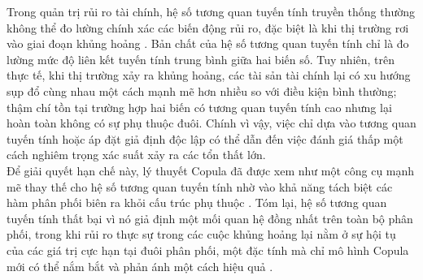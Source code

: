Trong quản trị rủi ro tài chính, hệ số tương quan tuyến tính truyền thống thường không thể đo lường chính xác các biến động rủi ro, đặc biệt là khi thị trường rơi vào giai đoạn khủng hoảng \cite{shreve2009faulty}. Bản chất của hệ số tương quan tuyến tính chỉ là đo lường mức độ liên kết tuyến tính trung bình giữa hai biến số. Tuy nhiên, trên thực tế, khi thị trường xảy ra khủng hoảng, các tài sản tài chính lại có xu hướng sụp đổ cùng nhau một cách mạnh mẽ hơn nhiều so với điều kiện bình thường; thậm chí tồn tại trường hợp hai biến có tương quan tuyến tính cao nhưng lại hoàn toàn không có sự phụ thuộc đuôi. Chính vì vậy, việc chỉ dựa vào tương quan tuyến tính hoặc áp đặt giả định độc lập có thể dẫn đến việc đánh giá thấp một cách nghiêm trọng xác suất xảy ra các tổn thất lớn. \\
Để giải quyết hạn chế này, lý thuyết Copula đã được xem như một công cụ mạnh mẽ thay thế cho hệ số tương quan tuyến tính nhờ vào khả năng tách biệt các hàm phân phối biên ra khỏi cấu trúc phụ thuộc \cite{genest2009advent}. Tóm lại, hệ số tương quan tuyến tính thất bại vì nó giả định một mối quan hệ đồng nhất trên toàn bộ phân phối, trong khi rủi ro thực sự trong các cuộc khủng hoảng lại nằm ở sự hội tụ của các giá trị cực hạn tại đuôi phân phối, một đặc tính mà chỉ mô hình Copula mới có thể nắm bắt và phản ánh một cách hiệu quả \cite{macquarie2024exercise}.